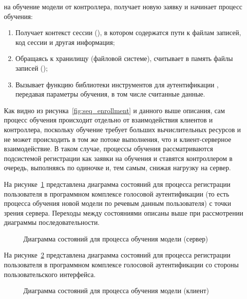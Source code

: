 \begin{enumerate}
на обучение модели от контроллера, получает новую заявку и начинает процесс
обучения:
    \begin{enumerate}
        \item Получает контекст сессии (), в котором
        содержатся пути к файлам записей, код сессии и другая информация;
        \item Обращаясь к хранилищу (файловой системе), считывает в память файлы
        записей ();
        \item Вызывает функцию библиотеки инструментов для аутентификации
        , передавая параметры обучения, в том числе считанные
        данные.
    \end{enumerate}
\end{enumerate}

Как видно из рисунка~\ref{fig:seq_enrollment} и данного выше описания, сам
процесс обучения происходит отдельно от взаимодействия клиентов и контроллера,
поскольку обучение требует больших вычислительных ресурсов и не может
происходить в том же потоке выполнения, что и клиент-серверное взаимодействие.
В таком случае, процессы обучения рассматриваются подсистемой регистрации как
заявки на обучения и ставятся контроллером в очередь, выполняясь по одиночке и,
тем самым, снижая нагрузку на сервер.

На рисунке~\ref{fig:enrollment_server_sd} представлена диаграмма состояний
для процесса регистрации пользователя в программном комплексе голосовой аутентификации (то
есть процесса обучения новой модели по речевым данным пользователя) с точки
зрения сервера. Переходы между состояниями описаны выше при рассмотрении
диаграммы последовательности.

\begin{figure}
    \caption{Диаграмма состояний для процесса обучения модели (сервер)}
    \label{fig:enrollment_server_sd}
\end{figure}

На рисунке~\ref{fig:enrollment_client_sd} представлена диаграмма состояний для
процесса регистрации пользователя в программном комплексе голосовой аутентификации со стороны
пользовательского интерфейса.
\begin{figure}[htp!]
    \caption{Диаграмма состояний для процесса обучения модели (клиент)}
    \label{fig:enrollment_client_sd}
\end{figure}


